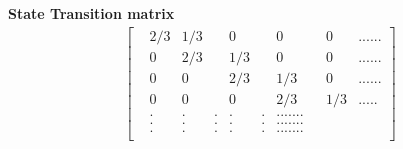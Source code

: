 \documentclass{article}
\begin{document}
\textbf{State Transition matrix}\\
\begin{align*}
\begin{bmatrix}
   &2/3  &1/3& &0&    &0&  &0& ......\\
   &0   &2/3& &1/3&  &0&  &0& ...... \\
   &0   &0&   &2/3& &1/3&  &0& ......\\
   &0   &0&   &0&   &2/3& &1/3&  ..... \\
     &.   &.    &.    &.    &.  &. ......\\
     &.   &.    &.    &.    &.  &. ......\\
     &.   &.    &.    &.    &.  &. ......\\
\end{bmatrix}
\end{align*}
\end{document}
